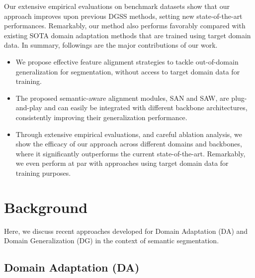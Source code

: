 \documentclass[10pt,twocolumn,letterpaper]{article}
\begin{document}
Our extensive empirical evaluations on benchmark datasets show that our approach improves upon previous DGSS methods, setting new state-of-the-art performances. Remarkably, our method also performs favorably compared with existing SOTA domain adaptation methods that are trained using target domain data. In summary, followings are the major contributions of our work. 


\vspace{-1.5mm}
\begin{itemize}
\setlength{\itemsep}{1pt}
\setlength{\parsep}{1pt}
\setlength{\parskip}{1pt}
\item We propose effective feature alignment strategies to tackle out-of-domain generalization for segmentation, without access to target domain data for training.
\item The proposed semantic-aware alignment modules, SAN and SAW, are plug-and-play and can easily be integrated with different backbone architectures, consistently improving their generalization performance.
\item Through extensive empirical evaluations, and careful ablation analysis, we show the efficacy of our approach across different domains and backbones, where it significantly outperforms the current state-of-the-art. Remarkably, we even perform at par with approaches using target domain data for training purposes.



\end{itemize}









\section{Background}

Here, we discuss recent approaches developed for Domain Adaptation (DA) and Domain Generalization (DG) in the context of semantic segmentation. 

\subsection{Domain Adaptation (DA)}
\end{document}
